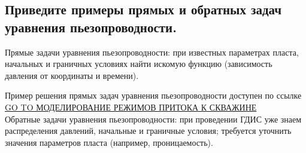 

\subsection{Приведите примеры прямых и обратных задач уравнения пьезопроводности.}

Прямые задачи уравнения пьезопроводности: при известных параметрах пласта, начальных и граничных условиях найти искомую функцию (зависимость давления от координаты и времени).

Пример решения прямых задач уравнения пьезопроводности доступен по ссылке \href{https://github.com/mualal/source/blob/main/well_productivity/productivity.ipynb}{GO TO МОДЕЛИРОВАНИЕ РЕЖИМОВ ПРИТОКА К СКВАЖИНЕ}
\\

Обратные задачи уравнения пьезопроводности: при проведении ГДИС уже знаем распределения давлений, начальные и граничные условия; требуется уточнить значения параметров пласта (например, проницаемость).


